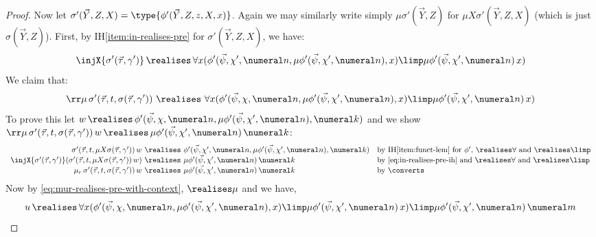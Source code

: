 \begin{proof}
    Now let $\sigma'(\vec Y,Z,X) = \type {\phi'(\vec Y,Z,z,X,x)}$. 
    Again we may similarly write simply $\mu\sigma'(\vec Y,Z)$ for $\mu X \sigma'(\vec Y,Z,X)$ (which is just $\sigma(\vec Y,Z)$).
    First, by IH\eqref{item:in-realises-pre} for $\sigma'(\vec Y,Z,X)$, we have:
    \begin{equation}
    \label{eq:in-realises-pre-ih}
        \injX{\sigma'(\vec \tau,\gamma')} \, \realises\, \forall x (\phi'(\vec \psi, \chi',\numeral n, \mu\phi'(\vec \psi,\chi',\numeral n),x) \limp \mu\phi'(\vec \psi,\chi',\numeral n)\, x)
    \end{equation}
    We claim that:
    \begin{equation}
    \label{eq:mur-realises-pre-with-context}
    \rr\mu\, \sigma'(\vec \tau,t,\sigma(\vec \tau,\gamma'))\ \realises\ 
    \forall x (\phi'(\vec \psi,\chi,\numeral n,\mu\phi'(\vec \psi,\chi',\numeral n),x) \limp \mu\phi'(\vec \psi,\chi',\numeral n)\, x)
    \end{equation}
    To prove this let $w\, \realises\, \phi'(\vec \psi, \chi,\numeral n,\mu\phi'(\vec \psi,\chi',\numeral n),\numeral k)$ and we show $ \rr\mu\, \sigma'(\vec \tau,t,\sigma(\vec \tau,\gamma'))\, w \, \realises\, \mu\phi'(\vec \psi,\allowbreak \chi',\numeral n)\, \numeral k$:
    \[
    \begin{array}{r@{\ \realises\ }ll}
         \sigma'(\vec \tau,t,\mu X \sigma(\vec \tau,\gamma')) \, w & \phi'(\vec \psi,\chi',\numeral n, \mu\phi'(\vec \psi, \chi',\numeral n), \numeral k) &\text{by IH\eqref{item:funct-lem} for $\phi'$, $\realises\forall $ and $\realises\limp$} \\
         \injX{\sigma'(\vec \tau,\gamma')} (\sigma'(\vec \tau,t,\mu X \sigma(\vec \tau,\gamma')) \, w) & \mu\phi'(\vec \psi,\chi',\numeral n)\, \numeral k & \text{by \eqref{eq:in-realises-pre-ih} and $\realises\forall$ and $\realises\limp$} \\
         \mu_r\, \sigma'(\vec \tau, t, \sigma(\vec \tau,\gamma'))\, w & \mu\phi'(\vec \psi, \chi', \numeral n)\, \numeral k & \text{by $\converts$}
    \end{array}
    \]
    Now by \eqref{eq:mur-realises-pre-with-context}, $\realises\mu$ and  we have,
    \begin{equation}
        u\, \realises\, \forall x (\phi'(\vec \psi,\chi,\numeral n,\mu\phi'(\vec \psi,\chi',\numeral n),x) \limp \mu\phi'(\vec \psi,\chi',\numeral n)\, x) \limp \mu\phi'(\vec \psi,\chi',\numeral n)\, \numeral m
    \end{equation}


\end{proof}

